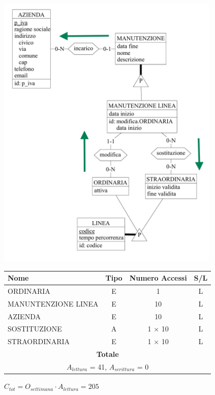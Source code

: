 \documentclass[12pt,a4paper]{report}
\begin{document}
\begin{enumerate}[label=\textbf{\arabic*)}]
	\begin{center}
	\includegraphics[width=0.8\textwidth]{VisualManunLinee}
	\end{center}
	\begin{table}[H]
	\centering
	\begin{tabular}{|l|c|c|c|}
	\hline
	Nome & Tipo & Numero Accessi & S/L \\
	\hline
	ORDINARIA & E & 1 & L \\
	\hline
	MANUNTENZIONE LINEA & E & 10 & L \\
	\hline
	AZIENDA & E & 10 & L \\
	\hline
	SOSTITUZIONE & A & 1 $\times$ 10 & L \\
	\hline
	STRAORDINARIA & E & 1 $\times$ 10 & L \\
          \hline
          \multicolumn{4}{c}{\textbf{Totale}} \\
          \multicolumn{4}{c}{${A_{lettura}}$ = 41, ${A_{scrittura}}$ = 0} \\
          \hline
	\end{tabular}
	\end{table}
	    \begin{center}
	    ${C_{tot} = {O_{settimana}}\cdot{A_{lettura}}= 205}$
	    \end{center}



\end{enumerate}
\end{document}
